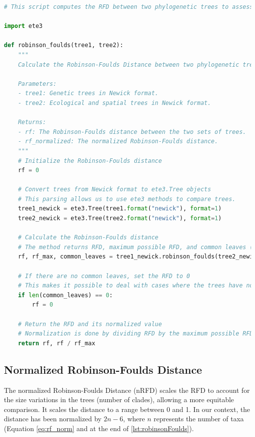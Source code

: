 \begin{lstlisting}[label=lst:robinsonFoulds,language=Python,caption=Python script for calculating the Robinson-Foulds Distance using the ete3 package in the aPhyloGeo package.]
# This script computes the RFD between two phylogenetic trees to assess their topological dissimilarity.

import ete3

def robinson_foulds(tree1, tree2):
    """
    Calculate the Robinson-Foulds Distance between two phylogenetic trees.

    Parameters:
    - tree1: Genetic trees in Newick format.
    - tree2: Ecological and spatial trees in Newick format.

    Returns:
    - rf: The Robinson-Foulds distance between the two sets of trees.
    - rf_normalized: The normalized Robinson-Foulds distance.
    """
    # Initialize the Robinson-Foulds distance
    rf = 0

    # Convert trees from Newick format to ete3.Tree objects
    # This parsing allows us to use ete3 methods to compare trees.
    tree1_newick = ete3.Tree(tree1.format("newick"), format=1)
    tree2_newick = ete3.Tree(tree2.format("newick"), format=1)

    # Calculate the Robinson-Foulds distance
    # The method returns RFD, maximum possible RFD, and common leaves (i.e., taxa) between the trees.
    rf, rf_max, common_leaves = tree1_newick.robinson_foulds(tree2_newick, unrooted_trees=True)

    # If there are no common leaves, set the RFD to 0
    # This makes it possible to deal with cases where the trees have no overlapping taxa.
    if len(common_leaves) == 0:
        rf = 0

    # Return the RFD and its normalized value
    # Normalization is done by dividing RFD by the maximum possible RFD.
    return rf, rf / rf_max
\end{lstlisting}

\subsection{Normalized Robinson-Foulds Distance}\label{RFnorm}

The normalized Robinson-Foulds Distance (nRFD) scales the RFD to account for the size variations in the trees (number of clades), allowing a more equitable comparison. It scales the distance to a range between 0 and 1. In our context, the distance has been normalized by $2n-6$, where $n$ represents the number of taxa (Equation \eqref{eq:rf_norm} and at the end of \autoref{lst:robinsonFoulds}). 

